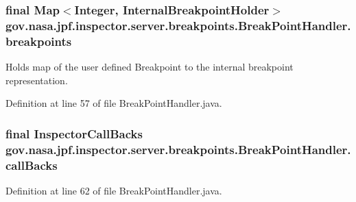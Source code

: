 \subsubsection[{\texorpdfstring{breakpoints}{breakpoints}}]{\setlength{\rightskip}{0pt plus 5cm}final Map$<$Integer, {\bf Internal\+Breakpoint\+Holder}$>$ gov.\+nasa.\+jpf.\+inspector.\+server.\+breakpoints.\+Break\+Point\+Handler.\+breakpoints\hspace{0.3cm}{\ttfamily [protected]}}\hypertarget{classgov_1_1nasa_1_1jpf_1_1inspector_1_1server_1_1breakpoints_1_1_break_point_handler_a034265be2e9419b28fa12d1b860295df}{}\label{classgov_1_1nasa_1_1jpf_1_1inspector_1_1server_1_1breakpoints_1_1_break_point_handler_a034265be2e9419b28fa12d1b860295df}


Holds map of the user defined Breakpoint to the internal breakpoint representation. 



Definition at line 57 of file Break\+Point\+Handler.\+java.

\subsubsection[{\texorpdfstring{call\+Backs}{callBacks}}]{\setlength{\rightskip}{0pt plus 5cm}final {\bf Inspector\+Call\+Backs} gov.\+nasa.\+jpf.\+inspector.\+server.\+breakpoints.\+Break\+Point\+Handler.\+call\+Backs\hspace{0.3cm}{\ttfamily [protected]}}\hypertarget{classgov_1_1nasa_1_1jpf_1_1inspector_1_1server_1_1breakpoints_1_1_break_point_handler_a1ee790b3c2c618b92a860b38e9171bfc}{}\label{classgov_1_1nasa_1_1jpf_1_1inspector_1_1server_1_1breakpoints_1_1_break_point_handler_a1ee790b3c2c618b92a860b38e9171bfc}


Definition at line 62 of file Break\+Point\+Handler.\+java.

